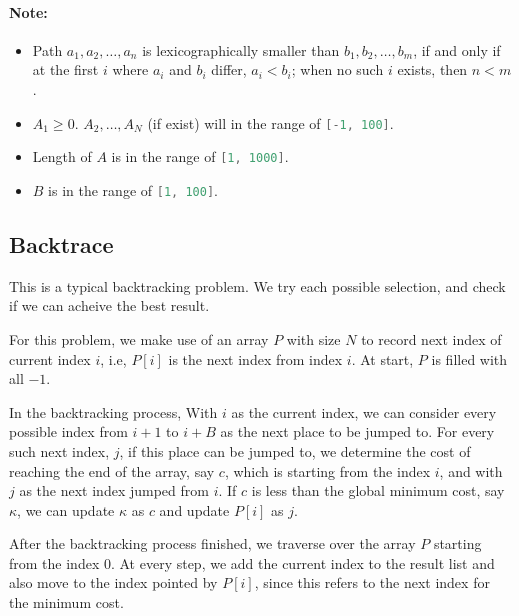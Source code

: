 \paragraph{Note:}

\begin{itemize}
\item Path $a_1, a_2, \ldots, a_n$ is lexicographically smaller than $b_1, b_2, \ldots, b_m$, if and only if at the first $i$ where $a_i$ and $b_i$ differ, $a_i < b_i$; when no such $i$ exists, then $n < m$.
\item $A_1 \geq 0$. $A_2, \ldots, A_N$ (if exist) will in the range of \lstinline[language=Java, basicstyle=\small\ttfamily, keywordstyle=\bfseries\color{green!40!black}]|[-1, 100]|.
\item Length of $A$ is in the range of \lstinline[language=Java, basicstyle=\small\ttfamily, keywordstyle=\bfseries\color{green!40!black}]|[1, 1000]|.
\item $B$ is in the range of \lstinline[language=Java, basicstyle=\small\ttfamily, keywordstyle=\bfseries\color{green!40!black}]|[1, 100]|.

\end{itemize}

\subsection{Backtrace}
This is a typical backtracking problem. We try each possible selection, and check if we can acheive the best result.

For this problem, we make use of an array $P$ with size $N$ to record next index of current index $i$, i.e, $P[i]$ is the next index from index $i$. At start, $P$ is filled  with all $-1$. 

In the backtracking process, With $i$ as the current index, we can consider every possible index from $i+1$ to $i+B$ as the next place to be jumped to. For every such next index, $j$, if this place can be jumped to, we determine the cost of reaching the end of the array, say $c$, which is starting from the index $i$, and with $j$ as the next index jumped from $i$. If $c$ is less than the global minimum cost, say $\kappa$, we can update $\kappa$ as $c$ and update $P[i]$ as $j$.

After the backtracking process finished, we traverse over the array $P$ starting from the index $0$. At every step, we add the current index to the result list and also move to the index pointed by $P[i]$, since this refers to the next index for the minimum cost.

